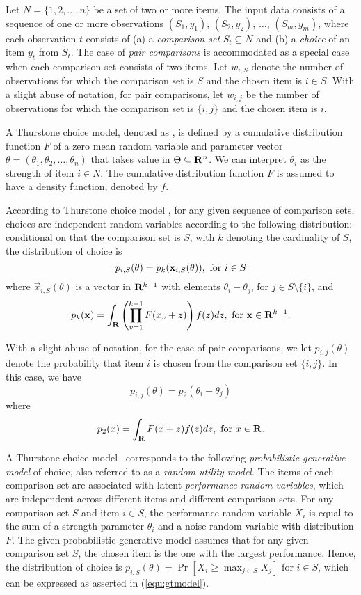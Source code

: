 
Let $N=\{1,2,\dots,n\}$ be a set of two or more items. The input data consists of a sequence of one or more observations $(S_1,y_1)$, $(S_2,y_2)$, $\ldots$, $(S_m,y_m)$, where each observation $t$ consists of (a) a \emph{comparison set} $S_t\subseteq N$ and (b) a \emph{choice} of an item $y_t$ from $S_t$. The case of \emph{pair comparisons} is accommodated as a special case when each comparison set consists of two items. Let $w_{i,S}$ denote the number of observations for which the comparison set is $S$ and the chosen item is $i\in S$. With a slight abuse of notation, for pair comparisons, let $w_{i,j}$ be the number of observations for which the comparison set is $\{i,j\}$ and the chosen item is $i$.

A Thurstone choice model, denoted as \GT, is defined by a cumulative distribution function $F$ of a zero mean random variable and parameter vector $\theta = (\theta_1,\theta_2,\ldots,\theta_n)$ that takes value in $\Theta\subseteq \mathbf{R}^n$. We can interpret $\theta_i$ as the strength of item $i\in N$. The cumulative distribution function $F$ is assumed to have a density function, denoted by $f$.

According to Thurstone choice model \GT, for any given sequence of comparison sets, choices are independent random variables according to the following distribution: conditional on that the comparison set is $S$, with $k$ denoting the cardinality of $S$, the distribution of choice is 
\begin{equation}
p_{i,S}(\theta) = p_{k}(\vec{x}_{i,S}(\theta)), \hbox{ for } i\in S
\label{equ:gtmodel}
\end{equation} 
where $\vec{x}_{i,S}(\theta)$ is a vector in $\mathbf{R}^{k-1}$ with elements $\theta_i-\theta_j$, for $j\in S\setminus\{i\}$, and
\begin{equation}
p_k(\vec{x}) = \int_{\reals} \left(\prod_{v=1}^{k-1} F(x_v+z)\right) f(z)dz, \hbox{ for } \vec{x} \in \reals^{k-1}.
\label{equ:pkfunc}
\end{equation}

With a slight abuse of notation, for the case of pair comparisons, we let $p_{i,j}(\theta)$ denote the probability that item $i$ is chosen from the comparison set $\{i,j\}$. In this case, we have 
$$
p_{i,j}(\theta)=p_2(\theta_i-\theta_j)
$$ 
where
$$
p_2(x) = \int_{\mathbf{R}}F(x+z) f(z) dz, \hbox{ for } x\in \mathbf{R}.
$$

A Thurstone choice model \GT\ corresponds to the following \emph{probabilistic generative model} of choice, also referred to as a \emph{random utility model}. The items of each comparison set are associated with latent \emph{performance random variables}, which are independent across different items and different comparison sets. For any comparison set $S$ and item $i\in S$, the performance random variable $X_i$ is equal to the sum of a strength parameter $\theta_i$ and a noise random variable with distribution $F$. The given probabilistic generative model assumes that for any given comparison set $S$, the chosen item is the one with the largest performance. Hence, the distribution of choice is $p_{i,S}(\theta) = \Pr[X_i \geq \max_{j\in S}X_j]$ for $i\in S$, which can be expressed as asserted in (\ref{equ:gtmodel}).

